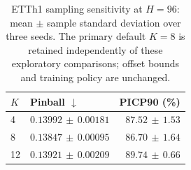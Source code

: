 \begin{table}[t]
\caption{ETTh1 sampling sensitivity at $H=96$: mean $\pm$ sample standard deviation over three seeds. The primary default $K=8$ is retained independently of these exploratory comparisons; offset bounds and training policy are unchanged.}
\label{tab:sampling_sensitivity}
\centering
\small
\begin{tabular}{@{}llr@{}}
\toprule
$K$ & Pinball $\downarrow$ & PICP90 (\%) \\
\midrule
4 & $0.13992\,\pm\,0.00181$ & $87.52\,\pm\,1.53$ \\
8 & $0.13847\,\pm\,0.00095$ & $86.70\,\pm\,1.64$ \\
12 & $0.13921\,\pm\,0.00209$ & $89.74\,\pm\,0.66$ \\
\bottomrule
\end{tabular}
\end{table}

